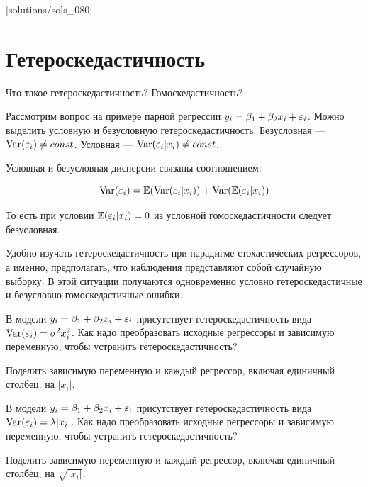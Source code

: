 [solutions/sols_080]

\chapter{Гетероскедастичность}


\begin{problem}
Что такое гетероскедастичность? Гомоскедастичность?

\begin{sol}
Рассмотрим вопрос на примере парной регрессии $y_i = \beta_1 + \beta_2 x_i + \varepsilon_i$. Можно выделить условную и безусловную гетероскедастичность. Безусловная — $\operatorname{Var}(\varepsilon_i)\neq const$. Условная — $\operatorname{Var}(\varepsilon_i | x_i) \neq const$.

Условная и безусловная дисперсии связаны соотношением:

\[
\operatorname{Var}(\varepsilon_i) = \mathbb{E}(\operatorname{Var}(\varepsilon_i|x_i)) + \operatorname{Var}(\mathbb{E}(\varepsilon_i|x_i))
\]

То есть при условии $\mathbb{E}(\varepsilon_i |x_i)=0$ из условной гомоскедастичности следует безусловная.

Удобно изучать гетероскедастичность при парадигме стохастических регрессоров, а именно, предполагать, что наблюдения представляют собой случайную выборку. В этой ситуации получаются одновременно условно гетероскедастичные и безусловно гомоскедастичные ошибки.
\end{sol}
\end{problem}


\begin{problem}
В модели $y_i = \beta_1 + \beta_2 x_i + \varepsilon_i$ присутствует гетероскедастичность вида $\operatorname{Var}(\varepsilon_i)=\sigma^2 x^2_i$. Как надо преобразовать исходные регрессоры и зависимую переменную, чтобы устранить гетероскедастичность?


\begin{sol}
Поделить зависимую переменную и каждый регрессор, включая единичный столбец, на $|x_i|$.
\end{sol}
\end{problem}



\begin{problem}
В модели $y_i = \beta_1 + \beta_2 x_i + \varepsilon_i$ присутствует гетероскедастичность вида $\operatorname{Var}(\varepsilon_i)=\lambda |x_i|$. Как надо преобразовать исходные регрессоры и зависимую переменную, чтобы устранить гетероскедастичность?


\begin{sol}
Поделить зависимую переменную и каждый регрессор, включая единичный столбец, на $\sqrt{|x_i|}$.
\end{sol}
\end{problem}



